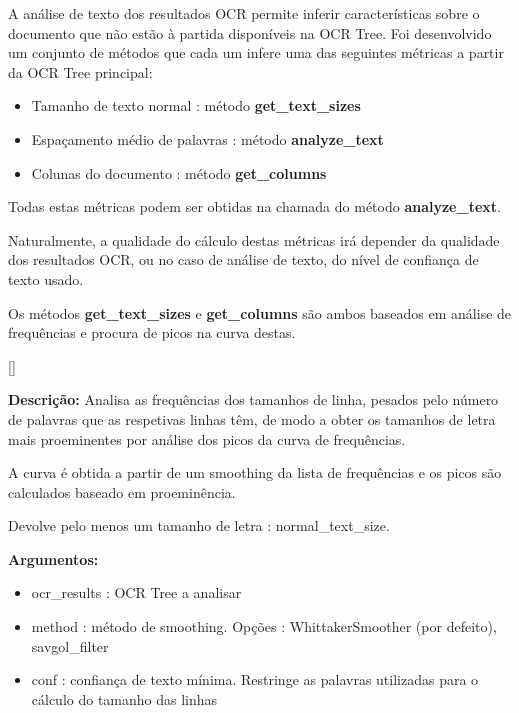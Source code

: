 \label{contribution_text_analyses}

A análise de texto dos resultados OCR permite inferir características sobre o documento que não estão à partida disponíveis na OCR Tree. Foi desenvolvido um conjunto de métodos que cada um infere uma das seguintes métricas a partir da OCR Tree principal:

\begin{itemize}
	\item Tamanho de texto normal : método \textbf{get\_text\_sizes}
	\item Espaçamento médio de palavras : método \textbf{analyze\_text}
	\item Colunas do documento : método \textbf{get\_columns}
\end{itemize}

Todas estas métricas podem ser obtidas na chamada do método \textbf{analyze\_text}.

Naturalmente, a qualidade do cálculo destas métricas irá depender da qualidade dos resultados OCR, ou no caso de análise de texto, do nível de confiança de texto usado.

Os métodos \textbf{get\_text\_sizes} e \textbf{get\_columns} são ambos baseados em análise de frequências e procura de picos na curva destas.


[\normalsize]

\textbf{Descrição:} Analisa as frequências dos tamanhos de linha, pesados pelo número de palavras que as respetivas linhas têm, de modo a obter os tamanhos de letra mais proeminentes por análise dos picos da curva de frequências.

A curva é obtida a partir de um smoothing da lista de frequências e os picos são calculados baseado em proeminência.

Devolve pelo menos um tamanho de letra : normal\_text\_size.

\textbf{Argumentos:}
\begin{itemize}\setlength\itemsep{-0.3em}
	\item ocr\_results : OCR Tree a analisar
	\item method : método de smoothing. Opções : WhittakerSmoother (por defeito), savgol\_filter
	\item conf : confiança de texto mínima. Restringe as palavras utilizadas para o cálculo do tamanho das linhas
\end{itemize}

